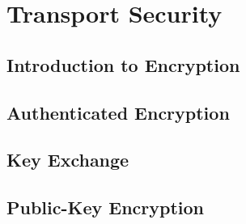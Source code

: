 \documentclass[
letterpaper, %
oneside
]{tufte-book}
\begin{document}


\part{Transport Security}

\chapter{Introduction to Encryption}



\chapter{Authenticated Encryption}



\chapter{Key Exchange}



\chapter{Public-Key Encryption}




\backmatter



\end{document}
